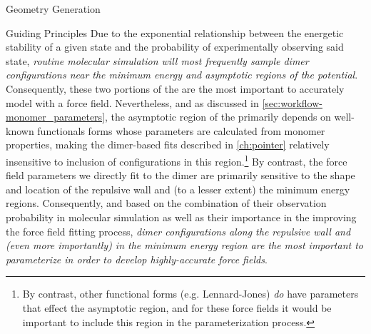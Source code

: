 \begin{section}{Geometry Generation}
\begin{subsection}{Guiding Principles}
Due to the exponential relationship between the energetic stability of a given
state and the probability of experimentally observing said state, \emph{routine molecular simulation will most frequently
sample dimer configurations near the minimum energy and asymptotic
regions of the potential}.\footnotemark{} Consequently,
these two portions of the \pes are the most important to accurately model with
a force field.
%
%
Nevertheless, and as discussed in \cref{sec:workflow-monomer_parameters}, the
asymptotic region of the \pes primarily depends on well-known functionals forms whose
parameters are calculated from monomer properties, making 
the dimer-based fits described in \cref{ch:pointer} relatively insensitive to
inclusion of configurations in this %
region.\footnote{By contrast, other functional forms (e.g. Lennard-Jones) \emph{do}
have parameters that effect the asymptotic region, and for these force fields
it would be important to include this region in the parameterization process.}
%
By contrast, the force field parameters we directly fit to the dimer \pes are
primarily sensitive to the shape and location of
the repulsive wall and (to a lesser extent) the minimum energy
regions.
Consequently, and based on the combination of their observation probability in molecular
simulation as well as their importance in the improving the force field fitting process,
\emph{dimer configurations along the repulsive wall and (even more
importantly) in the minimum energy region are the
most important to parameterize in order to develop highly-accurate force fields}.\footnotemark{}




\end{subsection}
\end{section}
